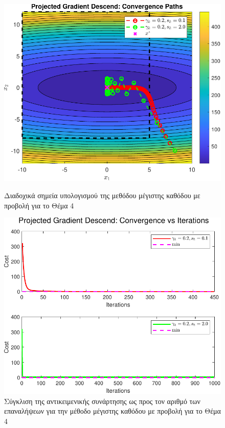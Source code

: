 \documentclass[a4paper,12pt]{article}
\begin{document}
\begin{figure}[h]
    \centering
    \begin{minipage}{0.47\textwidth}
        \centering
        \includegraphics[width=1\linewidth]{plot/task4_contour.pdf}
        \caption{\small Διαδοχικά σημεία υπολογισμού της μεθόδου μέγιστης καθόδου με προβολή για το Θέμα 4}
        \label{fig:task4_contour}
    \end{minipage} \hfill
    \begin{minipage}{0.47\textwidth}
        \centering
        \includegraphics[width=1\linewidth]{plot/task4_convergence.pdf}
        \caption{\small Σύγκλιση της αντικειμενικής συνάρτησης ως προς τον αριθμό των επαναλήψεων για την μέθοδο μέγιστης καθόδου με προβολή για το Θέμα 4}
        \label{fig:task4_convergence}
    \end{minipage}
\end{figure}
\end{document}
